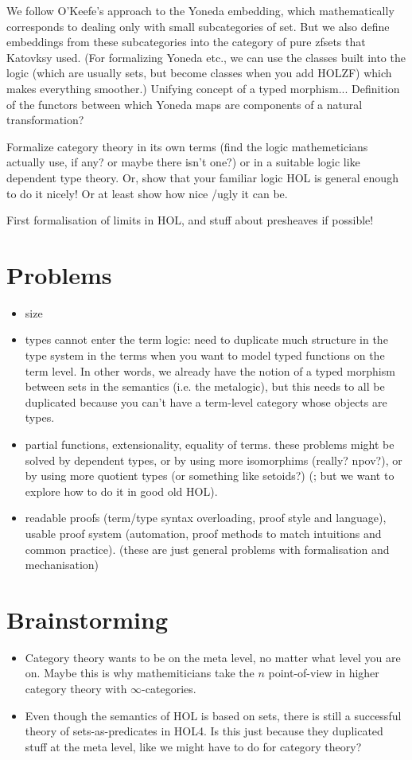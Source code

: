 \documentclass{article}
\begin{document}
We follow O'Keefe's approach to the Yoneda embedding, which mathematically corresponds to dealing only with small subcategories of set.
But we also define embeddings from these subcategories into the category of pure zfsets that Katovksy used.
(For formalizing Yoneda etc., we can use the classes built into the logic (which are usually sets, but become classes when you add HOLZF) which makes everything smoother.)
Unifying concept of a typed morphism...
Definition of the functors between which Yoneda maps are components of a natural transformation?

Formalize category theory in its own terms (find the logic mathemeticians actually use, if any? or maybe there isn't one?) or in a suitable logic like dependent type theory. Or, show that your familiar logic HOL is general enough to do it nicely! Or at least show how nice /ugly it can be.

First formalisation of limits in HOL, and stuff about presheaves if possible!

\section{Problems}
\begin{itemize}
\item size
\item types cannot enter the term logic: need to duplicate much structure in the type system in the terms when you want to model typed functions on the term level.
In other words, we already have the notion of a typed morphism between sets in the semantics (i.e. the metalogic), but this needs to all be duplicated because you can't have a term-level category whose objects are types.
\item partial functions, extensionality, equality of terms.
these problems might be solved by dependent types, or by using more isomorphims (really? npov?), or by using more quotient types (or something like setoids?) (; but we want to explore how to do it in good old HOL).
\item readable proofs (term/type syntax overloading, proof style and language), usable proof system (automation, proof methods to match intuitions and common practice). (these are just general problems with formalisation and mechanisation)
\end{itemize}

\section{Brainstorming}
\begin{itemize}
\item Category theory wants to be on the meta level, no matter what level you are on. Maybe this is why mathemiticians take the $n$ point-of-view in higher category theory with $\infty$-categories.
\item Even though the semantics of HOL is based on sets, there is still a successful theory of sets-as-predicates in HOL4. Is this just because they duplicated stuff at the meta level, like we might have to do for category theory?
\end{itemize}
\end{document}
